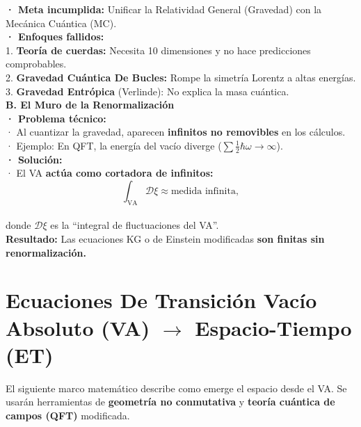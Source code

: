 \documentclass[a4paper]{article}
\theoremstyle{definition}
\theoremstyle{remark}
\numberwithin{equation}{section}
\begin{document}
	\textbf{· Meta incumplida:} Unificar la Relatividad General (Gravedad) con la Mecánica Cuántica (MC).\\
	
	\textbf{· Enfoques fallidos:}\\
	
	1. \textbf{Teoría de cuerdas:} Necesita 10 dimensiones y no hace predicciones comprobables.\\
	
	2. \textbf{Gravedad Cuántica De Bucles:} Rompe la simetría Lorentz a altas energías.\\
	
	3. \textbf{Gravedad Entrópica} (Verlinde): No explica la masa cuántica.\\
	
	\textbf{B. El Muro de la Renormalización}\\
	
	\textbf{· Problema técnico:}\\
	
	· Al cuantizar la gravedad, aparecen \textbf{infinitos no removibles} en los cálculos.\\
	
	· Ejemplo: En QFT, la energía del vacío diverge (\(\sum \frac{1}{2} \hbar \omega \to \infty \)).\\
	
	\textbf{· Solución:}\\
	
	· El VA \textbf{actúa como cortadora de infinitos:}\\
	
	\[
	\int_{\text{VA}} \mathcal{D} \xi \approx \text{medida infinita},
	\]\\
	
	donde \(\mathcal{D}\xi \) es la ``integral de fluctuaciones del VA''.\\
	
	\textbf{Resultado:} Las ecuaciones KG o de Einstein modificadas \textbf{son finitas sin renormalización.}
	
	\section{Ecuaciones De Transición Vacío Absoluto (VA) \(\rightarrow\) Espacio-Tiempo (ET)}
	\noindent El siguiente marco matemático describe como emerge el espacio desde el VA. Se usarán herramientas de \textbf{geometría no conmutativa} y \textbf{teoría cuántica de campos (QFT)} modificada.
	
\end{document}
